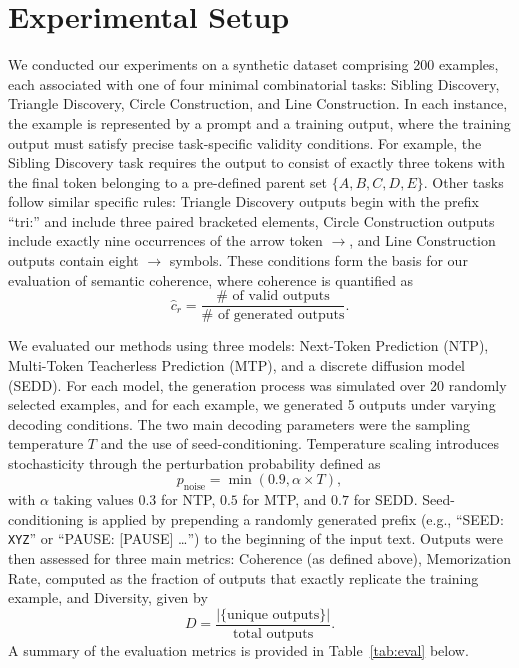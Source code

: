 \documentclass[11pt]{article}
\begin{document}
\section{Experimental Setup}
We conducted our experiments on a synthetic dataset comprising 200 examples, each associated with one of four minimal combinatorial tasks: Sibling Discovery, Triangle Discovery, Circle Construction, and Line Construction. In each instance, the example is represented by a prompt and a training output, where the training output must satisfy precise task-specific validity conditions. For example, the Sibling Discovery task requires the output to consist of exactly three tokens with the final token belonging to a pre-defined parent set \( \{A, B, C, D, E\} \). Other tasks follow similar specific rules: Triangle Discovery outputs begin with the prefix “tri:” and include three paired bracketed elements, Circle Construction outputs include exactly nine occurrences of the arrow token \( \rightarrow \), and Line Construction outputs contain eight \( \rightarrow \) symbols. These conditions form the basis for our evaluation of semantic coherence, where coherence is quantified as 
\[
\hat{c}_r = \frac{\# \text{ of valid outputs}}{\# \text{ of generated outputs}}.
\]

We evaluated our methods using three models: Next-Token Prediction (NTP), Multi-Token Teacherless Prediction (MTP), and a discrete diffusion model (SEDD). For each model, the generation process was simulated over 20 randomly selected examples, and for each example, we generated 5 outputs under varying decoding conditions. The two main decoding parameters were the sampling temperature \( T \) and the use of seed-conditioning. Temperature scaling introduces stochasticity through the perturbation probability defined as
\[
p_{\text{noise}} = \min(0.9, \alpha \times T),
\]
with \(\alpha\) taking values \(0.3\) for NTP, \(0.5\) for MTP, and \(0.7\) for SEDD. Seed-conditioning is applied by prepending a randomly generated prefix (e.g., “SEED: \texttt{XYZ}” or “PAUSE: [PAUSE] …”) to the beginning of the input text. Outputs were then assessed for three main metrics: Coherence (as defined above), Memorization Rate, computed as the fraction of outputs that exactly replicate the training example, and Diversity, given by 
\[
D = \frac{|\{ \text{unique outputs} \}|}{\text{total outputs}}.
\]
A summary of the evaluation metrics is provided in Table~\ref{tab:eval} below.
\end{document}
